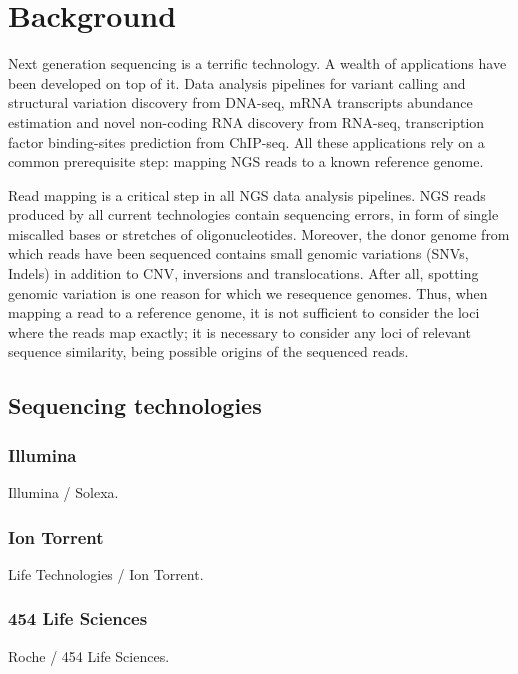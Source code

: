 
\chapter{Background}

Next generation sequencing is a terrific technology.
A wealth of applications have been developed on top of it.
Data analysis pipelines for variant calling and structural variation discovery from DNA-seq, mRNA transcripts abundance estimation and novel non-coding RNA discovery from RNA-seq, transcription factor binding-sites prediction from ChIP-seq.
All these applications rely on a common prerequisite step: mapping NGS reads to a known reference genome.

Read mapping is a critical step in all NGS data analysis pipelines.
NGS reads produced by all current technologies contain sequencing errors, in form of single miscalled bases or stretches of oligonucleotides.
Moreover, the donor genome from which reads have been sequenced contains small genomic variations (SNVs, Indels) in addition to CNV, inversions and translocations.
After all, spotting genomic variation is one reason for which we resequence genomes.
Thus, when mapping a read to a reference genome, it is not sufficient to consider the loci where the reads map exactly; it is necessary to consider any loci of relevant sequence similarity, being possible origins of the sequenced reads.

\section{Sequencing technologies}

\subsection{Illumina}
Illumina / Solexa.

\subsection{Ion Torrent}
Life Technologies / Ion Torrent.

\subsection{454 Life Sciences}
Roche / 454 Life Sciences.


